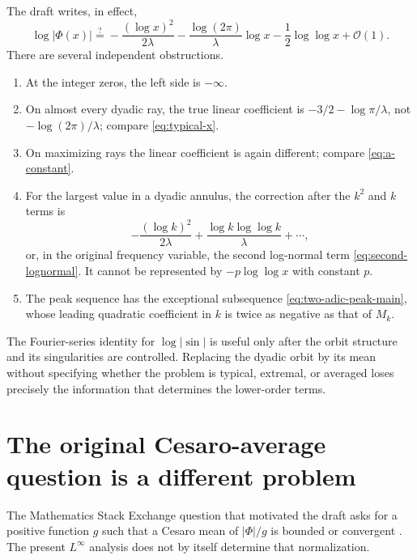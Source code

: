 \documentclass[11pt,oneside]{article}
\theoremstyle{definition}
\theoremstyle{remark}
\newcommand{\bigO}{\mathcal O}
\newcommand{\PhiF}{\Phi}
\begin{document}
The draft \cite{proveitDraft} writes, in effect,
\begin{equation}
 \log|\PhiF(x)|
 \stackrel{?}{=}
 -\frac{(\log x)^2}{2\lambda}
 -\frac{\log(2\pi)}{\lambda}\log x
 -\frac12\log\log x+\bigO(1).
 \label{eq:draft-proposed}
\end{equation}
There are several independent obstructions.
\begin{enumerate}
 \item At the integer zeros, the left side is \(-\infty\).
 \item On almost every dyadic ray, the true linear coefficient is
 \(-3/2-\log\pi/\lambda\), not \(-\log(2\pi)/\lambda\); compare
 \eqref{eq:typical-x}.
 \item On maximizing rays the linear coefficient is again different;
 compare \eqref{eq:a-constant}.
 \item For the largest value in a dyadic annulus, the correction after the
 \(k^2\) and \(k\) terms is
 \[
  -\frac{(\log k)^2}{2\lambda}
  +\frac{\log k\log\log k}{\lambda}+\cdots,
 \]
 or, in the original frequency variable, the second log-normal term
 \eqref{eq:second-lognormal}.  It cannot be represented by
 \(-p\log\log x\) with constant \(p\).
 \item The peak sequence has the exceptional subsequence
 \eqref{eq:two-adic-peak-main}, whose leading quadratic coefficient in
 \(k\) is twice as negative as that of \(M_k\).
\end{enumerate}
The Fourier-series identity for \(\log|\sin|\) is useful only after the orbit
structure and its singularities are controlled.  Replacing the dyadic orbit
by its mean without specifying whether the problem is typical, extremal, or
averaged loses precisely the information that determines the lower-order
terms.

\section{The original Cesaro-average question is a different problem}
\label{sec:averages}

The Mathematics Stack Exchange question that motivated the draft asks for a
positive function \(g\) such that a Cesaro mean of \(|\PhiF|/g\) is bounded or
convergent \cite{reshetnikovMSEdecay}.  The present \(L^\infty\) analysis does
not by itself determine that normalization.
\end{document}
